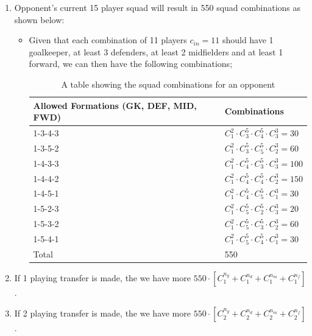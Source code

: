 \documentclass[12pt,oneside,a4paper]{book}
\theoremstyle{definition}
\theoremstyle{remark}
\begin{document}
					\begin{enumerate}
						\item[i.] Opponent’s current 15 player squad will result in 550 squad combinations as shown below:
						\begin{itemize}
							\item 	Given that each combination of 11 players  $c_{in}=11$ should have 1 goalkeeper, at least 3 defenders, at least 2 midfielders and at least 1 forward, we can then have the following combinations;
							\begin{table}[ht]
								\begin{center}
									\begin{tabular}{|l|l|}
										\hline
										Allowed Formations (GK, DEF, MID, FWD)& Combinations\\
										\hline
										1-3-4-3 & $C_1^2 \cdot C_3^5 \cdot C_4^5 \cdot C_3^3 =30$\\
										\hline
										1-3-5-2 & $C_1^2 \cdot C_3^5 \cdot C_5^5 \cdot C_2^3=60$\\
										\hline
										1-4-3-3 & $C_1^2 \cdot C_4^5 \cdot C_3^5 \cdot C_3^3=100$\\
										\hline
										1-4-4-2 & $C_1^2 \cdot C_4^5 \cdot C_4^5 \cdot C_2^3=150$\\
										\hline
										1-4-5-1 & $C_1^2 \cdot C_4^5 \cdot C_5^5 \cdot C_1^3=30$\\
										\hline
										1-5-2-3 & $C_1^2 \cdot C_5^5 \cdot C_2^5 \cdot C_3^3=20$\\
										\hline
										1-5-3-2 & $C_1^2 \cdot C_5^5 \cdot C_3^5 \cdot C_2^3=60$\\
										\hline
										1-5-4-1 & $C_1^2 \cdot C_5^5 \cdot C_4^5 \cdot C_1^3=30$\\
										\hline
										Total   & 550\\
										\hline
									\end{tabular}
								\end{center}
								\caption{A table showing the squad combinations for an opponent}
							\end{table}

						\end{itemize}
						\item[ii.] If 1 playing transfer is made, the we have more $550 \cdot [C_1^{n_g} +C_1^{n_d}+C_1^{n_m} +C_1^{n_f}]$.
						\item[iii.] If 2 playing transfer is made, the we have more $550 \cdot  [C_2^{n_g} +C_2^{n_d}+C_2^{n_m} +C_2^{n_f}]$.
					\end{enumerate}
\end{document}
